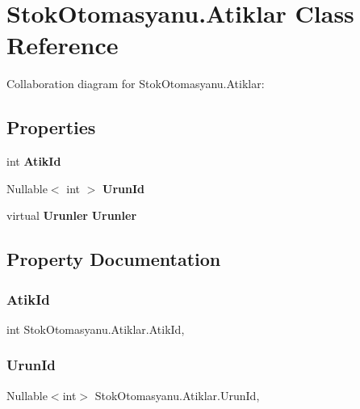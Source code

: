 \section{Stok\+Otomasyanu.\+Atiklar Class Reference}
\label{class_stok_otomasyanu_1_1_atiklar}


Collaboration diagram for Stok\+Otomasyanu.\+Atiklar\+:
\subsection*{Properties}
\begin{DoxyCompactItemize}
\item 
int \textbf{ Atik\+Id}\hspace{0.3cm}{\ttfamily  [get, set]}
\item 
Nullable$<$ int $>$ \textbf{ Urun\+Id}\hspace{0.3cm}{\ttfamily  [get, set]}
\item 
virtual \textbf{ Urunler} \textbf{ Urunler}\hspace{0.3cm}{\ttfamily  [get, set]}
\end{DoxyCompactItemize}


\subsection{Property Documentation}
\mbox{\label{class_stok_otomasyanu_1_1_atiklar_ad18e119b2fdab47d9177105a3ba61337}} 
\subsubsection{Atik\+Id}
{\footnotesize\ttfamily int Stok\+Otomasyanu.\+Atiklar.\+Atik\+Id\hspace{0.3cm}{\ttfamily [get]}, {\ttfamily [set]}}

\mbox{\label{class_stok_otomasyanu_1_1_atiklar_ad75da213395ea0982d58371c1eccc4dd}} 
\subsubsection{Urun\+Id}
{\footnotesize\ttfamily Nullable$<$int$>$ Stok\+Otomasyanu.\+Atiklar.\+Urun\+Id\hspace{0.3cm}{\ttfamily [get]}, {\ttfamily [set]}}

